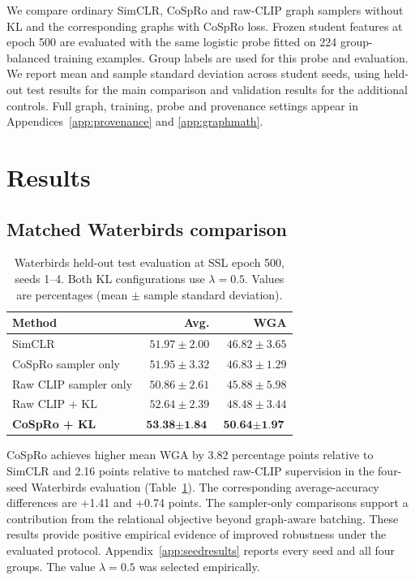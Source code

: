 \documentclass{article}
\begin{document}
We compare ordinary SimCLR, CoSpRo and raw-CLIP graph samplers without KL and the corresponding graphs with CoSpRo loss. Frozen student features at epoch 500 are evaluated with the same logistic probe fitted on 224 group-balanced training examples. Group labels are used for this probe and evaluation. We report mean and sample standard deviation across student seeds, using held-out test results for the main comparison and validation results for the additional controls. Full graph, training, probe and provenance settings appear in Appendices~\ref{app:provenance} and \ref{app:graphmath}.

\section{Results}
\subsection{Matched Waterbirds comparison}
\begin{table}[htbp]
\centering
\caption{Waterbirds held-out test evaluation at SSL epoch 500, seeds 1--4. Both KL configurations use $\lambda=0.5$. Values are percentages (mean $\pm$ sample standard deviation).}
\begin{tabular}{lrr}
\toprule
Method & Avg. & WGA \\
\midrule
SimCLR & $51.97 \pm 2.00$ & $46.82 \pm 3.65$ \\
CoSpRo sampler only & $51.95 \pm 3.32$ & $46.83 \pm 1.29$ \\
Raw CLIP sampler only & $50.86 \pm 2.61$ & $45.88 \pm 5.98$ \\
Raw CLIP + KL & $52.64 \pm 2.39$ & $48.48 \pm 3.44$ \\
\textbf{CoSpRo + KL} & $\textbf{53.38} \pm \textbf{1.84}$ & $\textbf{50.64} \pm \textbf{1.97}$ \\
\bottomrule
\end{tabular}
\label{tab:main}
\end{table}

CoSpRo achieves higher mean WGA by 3.82 percentage points relative to SimCLR and 2.16 points relative to matched raw-CLIP supervision in the four-seed Waterbirds evaluation (Table~\ref{tab:main}). The corresponding average-accuracy differences are +1.41 and +0.74 points. The sampler-only comparisons support a contribution from the relational objective beyond graph-aware batching. These results provide positive empirical evidence of improved robustness under the evaluated protocol. Appendix~\ref{app:seedresults} reports every seed and all four groups. The value $\lambda=0.5$ was selected empirically.
\end{document}
